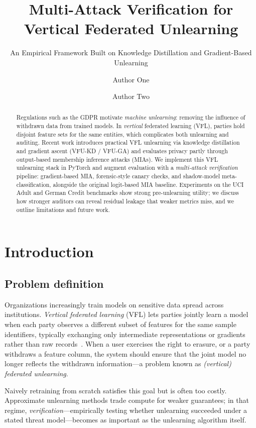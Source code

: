 \documentclass[sigconf,screen]{acmart}
\title{Multi-Attack Verification for Vertical Federated Unlearning}
\subtitle{An Empirical Framework Built on Knowledge Distillation and Gradient-Based Unlearning}
\author{Author One}
\affiliation{%
  \institution{Your University}
  \city{City}
  \country{Country}}
\author{Author Two}
\affiliation{%
  \institution{Your University}
  \city{City}
  \country{Country}}
\begin{document}
\begin{abstract}
Regulations such as the GDPR motivate \emph{machine unlearning}: removing the influence of withdrawn data from trained models. In \emph{vertical} federated learning (VFL), parties hold disjoint feature sets for the same entities, which complicates both unlearning and auditing. Recent work introduces practical VFL unlearning via knowledge distillation and gradient ascent (\textsc{VFU-KD} / \textsc{VFU-GA}) and evaluates privacy partly through output-based membership inference attacks (MIAs). We implement this VFL unlearning stack in PyTorch and augment evaluation with a \emph{multi-attack verification} pipeline: gradient-based MIA, forensic-style canary checks, and shadow-model meta-classification, alongside the original logit-based MIA baseline. Experiments on the UCI Adult and German Credit benchmarks show strong pre-unlearning utility; we discuss how stronger auditors can reveal residual leakage that weaker metrics miss, and we outline limitations and future work.
\end{abstract}

\maketitle

\section{Introduction}

\subsection{Problem definition}
Organizations increasingly train models on sensitive data spread across institutions. \emph{Vertical federated learning} (VFL) lets parties jointly learn a model when each party observes a different subset of features for the same sample identifiers, typically exchanging only intermediate representations or gradients rather than raw records~\cite{varshney2025vertical}. When a user exercises the right to erasure, or a party withdraws a feature column, the system should ensure that the joint model no longer reflects the withdrawn information---a problem known as \emph{(vertical) federated unlearning}.

Naively retraining from scratch satisfies this goal but is often too costly. Approximate unlearning methods trade compute for weaker guarantees; in that regime, \emph{verification}---empirically testing whether unlearning succeeded under a stated threat model---becomes as important as the unlearning algorithm itself.
\end{document}
